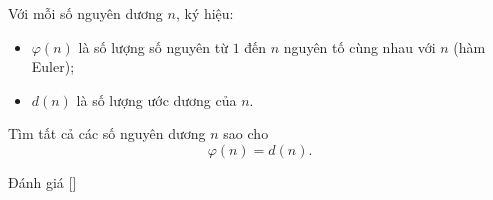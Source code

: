 \ifshowproblem
\begin{problem}\label{problem:JPN-2015-EGMO-TST-P4}
	Với mỗi số nguyên dương $n$, ký hiệu:
	\begin{itemize}[topsep=0pt, partopsep=0pt, itemsep=0pt]
		\item $\varphi(n)$ là số lượng số nguyên từ $1$ đến $n$ nguyên tố cùng nhau với $n$ (hàm Euler);
		\item $d(n)$ là số lượng ước dương của $n$.
	\end{itemize}
	
	Tìm tất cả các số nguyên dương $n$ sao cho
	\[
		\varphi(n) = d(n).
	\]
\end{problem}
\fi

\ifshowinfo
Đánh giá [\textbf{}]
\fi